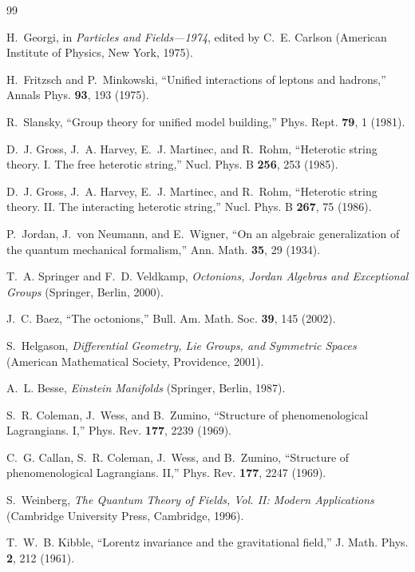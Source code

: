 \documentclass[aps,prd,preprint,longbibliography,nofootinbib,superscriptaddress,floatfix]{revtex4-2}
\begin{document}
\begin{thebibliography}{99}

H.~Georgi, in \textit{Particles and Fields---1974}, edited by C.~E. Carlson
(American Institute of Physics, New York, 1975).

H.~Fritzsch and P.~Minkowski,
``Unified interactions of leptons and hadrons,''
Annals Phys. \textbf{93}, 193 (1975).

R.~Slansky,
``Group theory for unified model building,''
Phys. Rept. \textbf{79}, 1 (1981).

D.~J. Gross, J.~A. Harvey, E.~J. Martinec, and R.~Rohm,
``Heterotic string theory. I. The free heterotic string,''
Nucl. Phys. B \textbf{256}, 253 (1985).

D.~J. Gross, J.~A. Harvey, E.~J. Martinec, and R.~Rohm,
``Heterotic string theory. II. The interacting heterotic string,''
Nucl. Phys. B \textbf{267}, 75 (1986).

P.~Jordan, J.~von Neumann, and E.~Wigner,
``On an algebraic generalization of the quantum mechanical formalism,''
Ann. Math. \textbf{35}, 29 (1934).

T.~A. Springer and F.~D. Veldkamp,
\textit{Octonions, Jordan Algebras and Exceptional Groups}
(Springer, Berlin, 2000).

J.~C. Baez,
``The octonions,''
Bull. Am. Math. Soc. \textbf{39}, 145 (2002).

S.~Helgason,
\textit{Differential Geometry, Lie Groups, and Symmetric Spaces}
(American Mathematical Society, Providence, 2001).

A.~L. Besse,
\textit{Einstein Manifolds}
(Springer, Berlin, 1987).

S.~R. Coleman, J.~Wess, and B.~Zumino,
``Structure of phenomenological Lagrangians. I,''
Phys. Rev. \textbf{177}, 2239 (1969).

C.~G. Callan, S.~R. Coleman, J.~Wess, and B.~Zumino,
``Structure of phenomenological Lagrangians. II,''
Phys. Rev. \textbf{177}, 2247 (1969).

S.~Weinberg,
\textit{The Quantum Theory of Fields, Vol. II: Modern Applications}
(Cambridge University Press, Cambridge, 1996).

T.~W.~B. Kibble,
``Lorentz invariance and the gravitational field,''
J. Math. Phys. \textbf{2}, 212 (1961).


\end{thebibliography}
\end{document}
